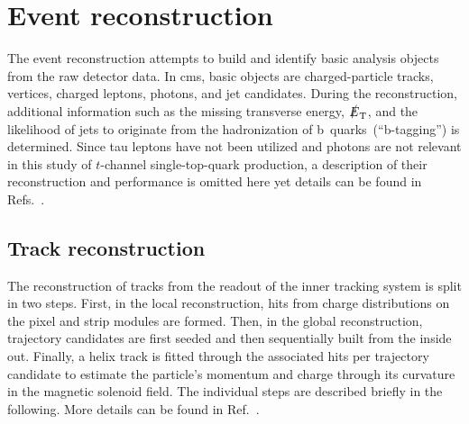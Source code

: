 \chapter{Event reconstruction}
\label{ch:reconstruction}


The event reconstruction attempts to build and identify basic analysis objects from the raw detector data. In \gls{cms}, basic objects are charged-particle tracks, vertices, charged leptons, photons, and jet candidates. During the reconstruction, additional information such as the missing transverse energy, $\slashed{E}_{\textrm{T}}$, and the likelihood of jets to originate from the hadronization of b~quarks~(``b-tagging'') is determined. Since tau leptons have not been utilized and photons are not relevant in this study of $t$-channel single-top-quark production, a description of their reconstruction and performance is omitted here yet details can be found in Refs.~\cite{Khachatryan:2015dfa,Khachatryan:2015iwa}.


\section{Track reconstruction}
\label{sec:reconstruction-track}

The reconstruction of tracks from the readout of the inner tracking system is split in two steps. First, in the local reconstruction, hits from charge distributions on the pixel and strip modules are formed. Then, in the global reconstruction, trajectory candidates are first seeded and then sequentially built from the inside out. Finally, a helix track is fitted through the associated hits per trajectory candidate to estimate the particle's momentum and charge through its curvature in the magnetic solenoid field. The individual steps are described briefly in the following. More details can be found in Ref.~\cite{Chatrchyan:2014fea}.


